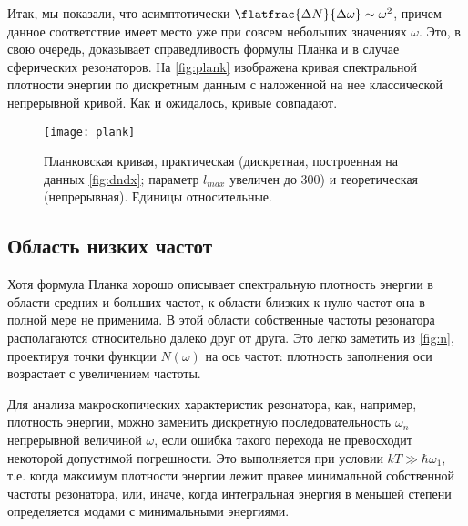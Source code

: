     Итак, мы показали, что асимптотически $\flatfrac{\Delta N}{\Delta \omega} \sim \omega^2$, причем данное соответствие имеет место уже при совсем небольших значениях $\omega$. Это, в свою очередь, доказывает справедливость формулы Планка и в случае сферических резонаторов. На \autoref{fig:plank} изображена кривая спектральной плотности энергии по дискретным данным с наложенной на нее классической непрерывной кривой. Как и ожидалось, кривые совпадают.
    \begin{figure}[h]
        \centering
        \texttt{[image: plank]}
        \caption[]{Планковская кривая, практическая (дискретная, построенная на данных \autoref{fig:dndx}; параметр $l_{max}$ увеличен до $300$) и теоретическая (непрерывная). Единицы относительные.}
        \label{fig:plank}
    \end{figure}

%
%
%
%
%
%

\subsection{Область низких частот}

    Хотя формула Планка хорошо описывает спектральную плотность энергии в области средних и больших частот, к области близких к нулю частот она в полной мере не применима. В этой области собственные частоты резонатора располагаются относительно далеко друг от друга. Это легко заметить из \autoref{fig:n}, проектируя точки функции $N(\omega)$ на ось частот: плотность заполнения оси возрастает с увеличением частоты.

    Для анализа макроскопических характеристик резонатора, как, например, плотность энергии, можно заменить дискретную последовательность $\omega_n$ непрерывной величиной $\omega$, если ошибка такого перехода не превосходит некоторой допустимой погрешности. Это выполняется при условии $kT \gg \hbar \omega_1$, т.е. когда максимум плотности энергии лежит правее минимальной собственной частоты резонатора, или, иначе, когда интегральная энергия в меньшей степени определяется модами с минимальными энергиями.


